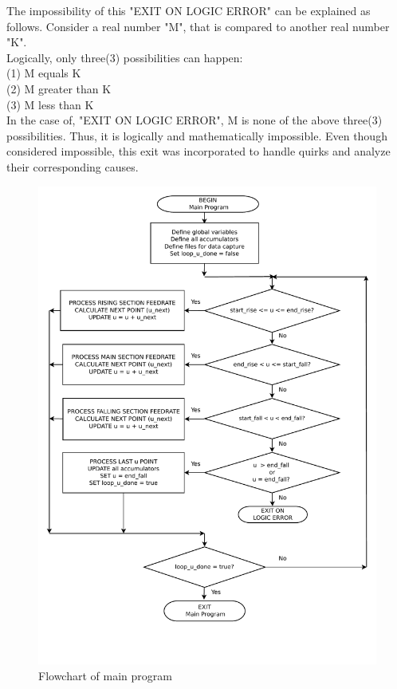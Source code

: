 The impossibility of this "EXIT ON LOGIC ERROR" can be explained as follows. Consider a real number "M", that is compared to another real number "K". \\

\noindent Logically, only three(3) possibilities can happen: \\
(1) M equals K \\
(2) M greater than K \\ 
(3) M less than K \\

\noindent In the case of, "EXIT ON LOGIC ERROR", M is none of the above three(3) possibilities. Thus, it is logically and mathematically impossible. Even though considered impossible, this exit was incorporated to handle quirks and analyze their corresponding causes.

\clearpage
\pagebreak


\begin{figure}
	\caption{Flowchart of main program}
	\label{main-10-Main-Program-Algorithm.pdf}
	\centering
	\includegraphics[width=1.15\textwidth,]{Images/Chap3/00-main-10-Main-Program-Algorithm.pdf} 
\end{figure}

